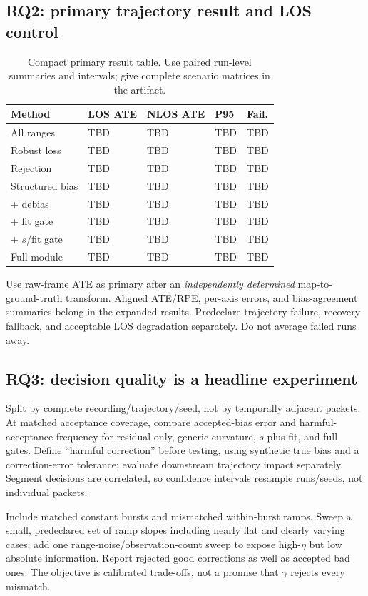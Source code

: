 \documentclass[conference]{IEEEtran}
\begin{document}
\subsection{RQ2: primary trajectory result and LOS control}
\begin{table}[t]
\centering\small
\caption{Compact primary result table. Use paired run-level summaries and intervals; give complete scenario matrices in the artifact.}
\label{tab:main}
\begin{tabularx}{\columnwidth}{@{}lXXXX@{}}
\toprule
Method & LOS ATE & NLOS ATE & P95 & Fail.\\
\midrule
All ranges & TBD & TBD & TBD & TBD\\
Robust loss & TBD & TBD & TBD & TBD\\
Rejection & TBD & TBD & TBD & TBD\\
Structured bias & TBD & TBD & TBD & TBD\\
+ debias & TBD & TBD & TBD & TBD\\
+ fit gate & TBD & TBD & TBD & TBD\\
+ $s$/fit gate & TBD & TBD & TBD & TBD\\
Full module & TBD & TBD & TBD & TBD\\
\bottomrule
\end{tabularx}
\end{table}
Use raw-frame ATE as primary after an \emph{independently determined} map-to-ground-truth transform. Aligned ATE/RPE, per-axis errors, and bias-agreement summaries belong in the expanded results. Predeclare trajectory failure, recovery fallback, and acceptable LOS degradation separately. Do not average failed runs away.

\subsection{RQ3: decision quality is a headline experiment}
\label{sec:rq3}
Split by complete recording/trajectory/seed, not by temporally adjacent packets. At matched acceptance coverage, compare accepted-bias error and harmful-acceptance frequency for residual-only, generic-curvature, $s$-plus-fit, and full gates. Define ``harmful correction'' before testing, using synthetic true bias and a correction-error tolerance; evaluate downstream trajectory impact separately. Segment decisions are correlated, so confidence intervals resample runs/seeds, not individual packets.

Include matched constant bursts and mismatched within-burst ramps. Sweep a small, predeclared set of ramp slopes including nearly flat and clearly varying cases; add one range-noise/observation-count sweep to expose high-$\eta$ but low absolute information. Report rejected good corrections as well as accepted bad ones. The objective is calibrated trade-offs, not a promise that $\gamma$ rejects every mismatch.
\end{document}
